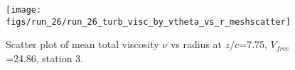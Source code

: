 \begin{figure}[H]
\centering
\texttt{[image: figs/run\_26/run\_26\_turb\_visc\_by\_vtheta\_vs\_r\_meshscatter]}
\caption{Scatter plot of mean total viscosity $\nu$ vs radius at $z/c$=7.75, $V_{free}$=24.86, station 3.}
\label{fig:run_26_turb_visc_by_vtheta_vs_r_meshscatter}
\end{figure}


